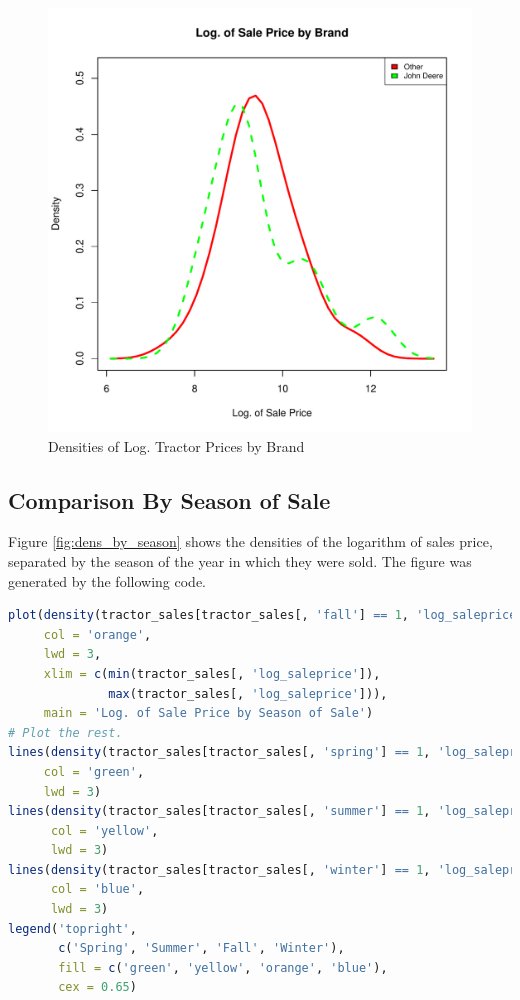 \documentclass[11pt]{book}
\begin{document}
\begin{figure}[h!]
  \centering
  \includegraphics[scale = 0.5, keepaspectratio=true]{../Figures/dens_by_brand}
  \caption{Densities of Log. Tractor Prices by Brand} \label{fig:dens_by_brand}
\end{figure}


\pagebreak
\subsection{Comparison By Season of Sale}

Figure \ref{fig:dens_by_season} shows 
the densities of the logarithm of sales price,
separated by the season of the year in which they were sold.
The figure was generated by the following code.
% 

\begin{lstlisting}[language=R]
plot(density(tractor_sales[tractor_sales[, 'fall'] == 1, 'log_saleprice']),
     col = 'orange',
     lwd = 3,
     xlim = c(min(tractor_sales[, 'log_saleprice']),
              max(tractor_sales[, 'log_saleprice'])),
     main = 'Log. of Sale Price by Season of Sale')
# Plot the rest.
lines(density(tractor_sales[tractor_sales[, 'spring'] == 1, 'log_saleprice']),
     col = 'green',
     lwd = 3)
lines(density(tractor_sales[tractor_sales[, 'summer'] == 1, 'log_saleprice']),
      col = 'yellow',
      lwd = 3)
lines(density(tractor_sales[tractor_sales[, 'winter'] == 1, 'log_saleprice']),
      col = 'blue',
      lwd = 3)
legend('topright',
       c('Spring', 'Summer', 'Fall', 'Winter'),
       fill = c('green', 'yellow', 'orange', 'blue'),
       cex = 0.65)
\end{lstlisting}
\end{document}
